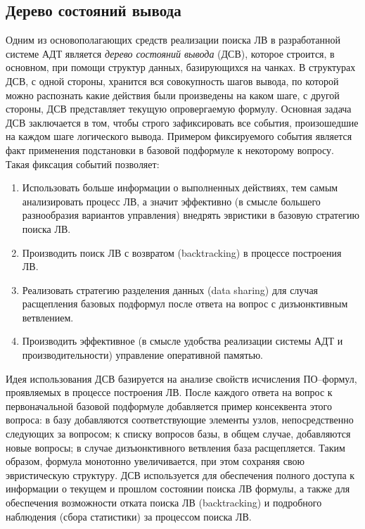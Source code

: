 \subsection{Дерево состояний вывода}
Одним из основополагающих средств реализации поиска ЛВ в разработанной системе АДТ является \emph{дерево состояний вывода} (ДСВ), которое строится, в основном, при помощи структур данных, базирующихся на чанках. В структурах ДСВ, с одной стороны, хранится вся совокупность шагов вывода, по которой можно распознать какие действия были произведены на каком шаге, с другой стороны, ДСВ представляет текущую опровергаемую формулу. Основная задача ДСВ заключается в том, чтобы строго зафиксировать все события, произошедшие на каждом шаге логического вывода. Примером фиксируемого события является факт применения подстановки в базовой подформуле к некоторому вопросу. Такая фиксация событий позволяет:
\begin{enumerate}
 \item Использовать больше информации о выполненных действиях, тем самым анализировать процесс ЛВ, а значит эффективно (в смысле большего разнообразия вариантов управления) внедрять эвристики в базовую стратегию поиска ЛВ.
 \item Производить поиск ЛВ с возвратом (backtracking) в процессе построения ЛВ.
 \item Реализовать стратегию разделения данных (data sharing) для случая расщепления базовых подформул после ответа на вопрос с дизъюнктивным ветвлением.
 \item Производить эффективное (в смысле удобства реализации системы АДТ и производительности) управление оперативной памятью.
\end{enumerate}

Идея использования ДСВ базируется на анализе свойств исчисления ПО--формул, проявляемых в процессе построения ЛВ. После каждого ответа на вопрос к первоначальной базовой подформуле добавляется пример консеквента этого вопроса: в базу добавляются соответствующие элементы узлов, непосредственно следующих за вопросом; к списку вопросов базы, в общем случае, добавляются новые вопросы; в случае дизъюнктивного ветвления база расщепляется. Таким образом, формула монотонно увеличивается, при этом сохраняя свою эвристическую структуру. ДСВ используется для обеспечения полного доступа к информации о текущем и прошлом состоянии поиска ЛВ формулы, а также для обеспечения возможности отката поиска ЛВ (backtracking) и подробного наблюдения (сбора статистики) за процессом поиска ЛВ.

